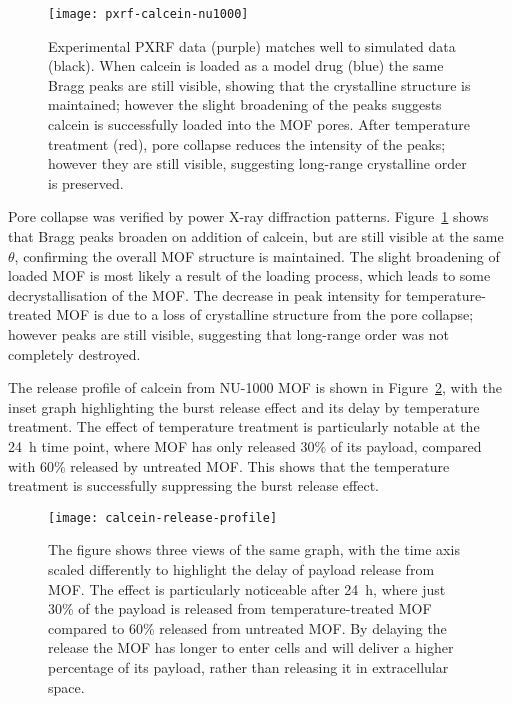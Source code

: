 \begin{figure}[htbp!]
\centering
\texttt{[image: pxrf-calcein-nu1000]}
\caption[MOFs: PXRF confirms calcein enters NU-1000 and temperature treatment causes partial pore collapse]{ Experimental PXRF data (purple) matches well to simulated data (black). When calcein is loaded as a model drug (blue) the same Bragg peaks are still visible, showing that the crystalline structure is maintained; however the slight broadening of the peaks suggests calcein is successfully loaded into the MOF pores. After temperature treatment (red), pore collapse reduces the intensity of the peaks; however they are still visible, suggesting long-range crystalline order is preserved. }
\label{fig:MOF-PXRF}
\end{figure}

Pore collapse was verified by power X-ray diffraction patterns. 
Figure~\ref{fig:MOF-PXRF} shows that Bragg peaks broaden on addition of calcein, but are still visible at the same $\theta$, confirming the overall MOF structure is maintained. 
The slight broadening of loaded MOF is most likely a result of the loading process, which leads to some decrystallisation of the MOF. 
The decrease in peak intensity for temperature-treated MOF is due to a loss of crystalline structure from the pore collapse; however peaks are still visible, suggesting that long-range order was not completely destroyed. %

The release profile of calcein from NU-1000 MOF is shown in Figure~\ref{fig:calcein-release-profile}, with the inset graph highlighting the burst release effect and its delay by temperature treatment. 
The effect of temperature treatment is particularly notable at the \SI{24}{\hour} time point, where MOF has only released 30\% of its payload, compared with 60\% released by untreated MOF.
This shows that the temperature treatment is successfully suppressing the burst release effect. 
 
\begin{figure}[htbp!]
\centering
\texttt{[image: calcein-release-profile]}
\caption[MOFs: Payload release is delayed by temperature treatment]{ The figure shows three views of the same graph, with the time axis scaled differently to highlight the delay of payload release from MOF. The effect is particularly noticeable after \SI{24}{\hour}, where just 30\% of the payload is released from temperature-treated MOF compared to 60\% released from untreated MOF. By delaying the release the MOF has longer to enter cells and will deliver a higher percentage of its payload, rather than releasing it in extracellular space. }
\label{fig:calcein-release-profile}
\end{figure}

